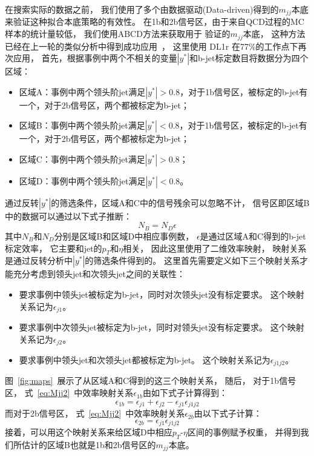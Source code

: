 在搜索实际的数据之前，
我们使用了多个由数据驱动(Data-driven)得到的$m_{jj}$本底
来验证这种拟合本底策略的有效性。
在1b和2b信号区，由于来自QCD过程的MC样本的统计量较低，
我们使用ABCD方法来获取用于
验证的$m_{jj}$本底，
这种方法已经在上一轮的类似分析中得到成功应用~\cite{ATLASDijet9}，
这里使用%
DL1r
在77\%的工作点下再次应用，
首先，根据事例中两个不相关的变量$|y^*|$和b-jet标定数目将数据分为四个区域：
\begin{itemize}
  \item 区域A：事例中两个领头阶jet满足$|y^*|>0.8$，对于1b信号区，被标定的b-jet有一个，对于2b信号区，两个都被标定为b-jet；
  \item 区域B：事例中两个领头阶jet满足$|y^*|<0.8$，对于1b信号区，被标定的b-jet有一个，对于2b信号区，两个都被标定为b-jet；
  \item 区域C：事例中两个领头阶jet满足$|y^*|>0.8$；
  \item 区域D：事例中两个领头阶jet满足$|y^*|<0.8$。
\end{itemize}
通过反转$|y^*|$的筛选条件，区域A和C中的信号残余可以忽略不计，
信号区即区域B中的数据可以通过以下式子推断：
\begin{equation}
\label{eq:Mjj2}
N_B=N_D	\epsilon
\end{equation}
其中$N_B$和$N_D$分别是区域B和区域D中相应事例数，
$\epsilon$是通过区域A和C得到的b-jet标定效率，
它主要和jet的$p_{T}$和$\eta$相关，
因此这里使用了二维效率映射，
映射关系是通过反转分析中$|y^*|$的筛选条件得到的。
这里首先需要定义如下三个映射关系才能充分考虑到领头jet和次领头jet之间的关联性：
\begin{itemize}
  \item 要求事例中领头jet被标定为b-jet，同时对次领头jet没有标定要求。
 这个映射关系记为$\epsilon_{j1}$。
   \item 要求事例中次领头jet被标定为b-jet，同时对领头jet没有标定要求。
 这个映射关系记为$\epsilon_{j2}$。
   \item 要求事例中领头jet和次领头jet都被标定为b-jet。
 这个映射关系记为$\epsilon_{j1j2}$。
\end{itemize}
图~\ref{fig:maps}~展示了从区域A和C得到的这三个映射关系，
随后，
对于1b信号区，
式~\ref{eq:Mjj2}~中效率映射关系$\epsilon_{1b}$由如下式子计算得到：
\begin{equation}
\label{eq:Mjj3}
\epsilon_{1b} = \epsilon_{j1} + \epsilon_{j2} - \epsilon_{j1} \epsilon_{j1j2}
\end{equation}
而对于2b信号区，
式~\ref{eq:Mjj2}~中效率映射关系$\epsilon_{2b}$由以下式子计算：
\begin{equation}
\label{eq:Mjj4}
\epsilon_{2b} = \epsilon_{j1}  \epsilon_{j1j2}
\end{equation}
接着，可以用这个映射关系来给区域D中相应$p_{T}$-$\eta$区间的事例赋予权重，
并得到我们所估计的区域B也就是1b和2b信号区的$m_{jj}$本底。

